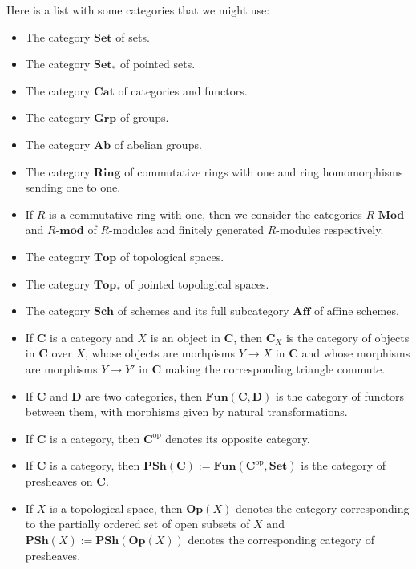 \documentclass[12pt,reqno,a4paper]{amsart}
\theoremstyle{plain}
\theoremstyle{definition}
\theoremstyle{remark}
\begin{document}
Here is a list with some categories that we might use:
\begin{itemize}
  \item The category $\mathbf{Set}$ of sets.
  \item The category $\mathbf{Set}_{*}$ of pointed sets.
  \item The category $\mathbf{Cat}$ of categories and functors.
  \item The category $\mathbf{Grp}$ of groups.
  \item The category $\mathbf{Ab}$ of abelian groups.
  \item The category $\mathbf{Ring}$ of commutative rings with one and ring homomorphisms sending one to one.
  \item If $R$ is a commutative ring with one, then we consider the categories $R$-$\mathbf{Mod}$ and $R$-$\mathbf{mod}$ of $R$-modules and finitely generated $R$-modules respectively.
  \item The category $\mathbf{Top}$ of topological spaces.
  \item The category $\mathbf{Top}_{*}$ of pointed topological spaces.
  \item The category $\mathbf{Sch}$ of schemes and its full subcategory $\mathbf{Aff}$ of affine schemes.
  \item If $\mathbf{C}$ is a category and $X$ is an object in $\mathbf{C}$, then $\mathbf{C}_{X}$ is the category of objects in $\mathbf{C}$ over $X$, whose objects are morhpisms $Y \to X$ in $\mathbf{C}$ and whose morphisms are morphisms $Y \to Y'$ in $\mathbf{C}$ making the corresponding triangle commute.
  \item If $\mathbf{C}$ and $\mathbf{D}$ are two categories, then $\mathbf{Fun}(\mathbf{C},\mathbf{D})$ is the category of functors between them, with morphisms given by natural transformations.
  \item If $\mathbf{C}$ is a category, then $\mathbf{C}^{\mathrm{op}}$ denotes its opposite category.
  \item If $\mathbf{C}$ is a category, then $\mathbf{PSh}(\mathbf{C}):= \mathbf{Fun}(\mathbf{C}^{\mathrm{op}},\mathbf{Set})$ is the category of presheaves on $\mathbf{C}$.
  \item If $X$ is a topological space, then $\mathbf{Op}(X)$ denotes the category corresponding to the partially ordered set of open subsets of $X$ and $\mathbf{PSh}(X) := \mathbf{PSh}(\mathbf{Op}(X))$ denotes the corresponding category of presheaves.
\end{itemize}
\end{document}
